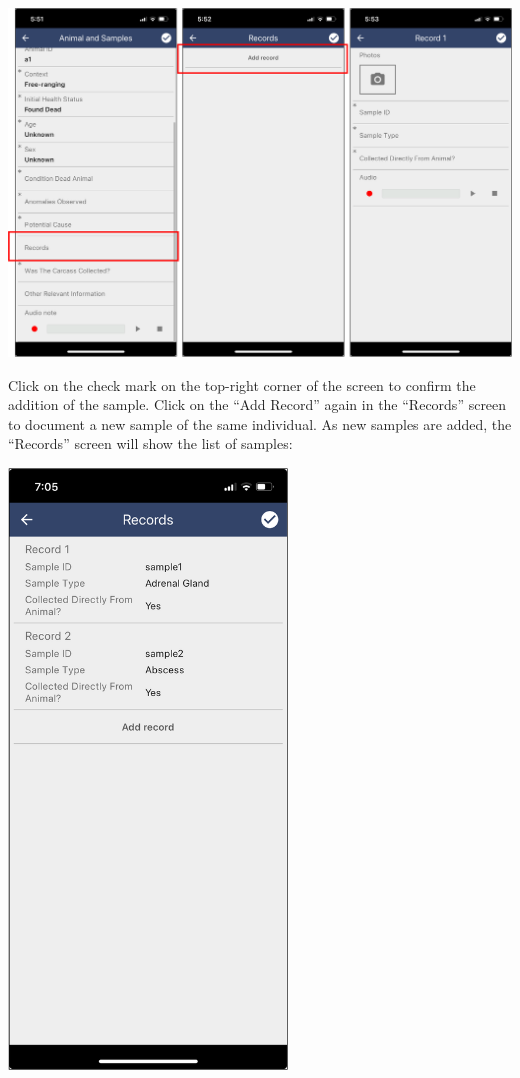 \documentclass[
  letterpaper,
  DIV=11,
  numbers=noendperiod]{scrreprt}
\begin{document}
\includegraphics[width=8.75in,height=\textheight]{Pictures_for_manual/Picture17.png}

Click on the check mark on the top-right corner of the screen to confirm
the addition of the sample. Click on the ``Add Record'' again in the
``Records'' screen to document a new sample of the same individual. As
new samples are added, the ``Records'' screen will show the list of
samples:

\includegraphics[width=2.91667in,height=\textheight]{Pictures_for_manual/Picture18.png}
\end{document}
